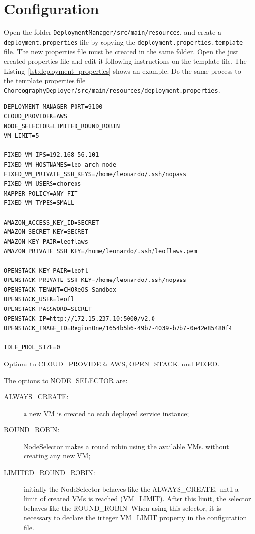 \documentclass[a4paper, 10pt]{article}
\begin{document}
\section{Configuration}

Open the folder \texttt{DeploymentManager/src/main/resources}, and create a \texttt{deployment.properties} file by copying the \texttt{deployment.properties.template} file. The new properties file must be created in the same folder. Open the just created properties file and edit it following instructions on the template file. The Listing~\ref{lst:deployment_properties} shows an example. Do the same process to the template properties file \texttt{ChoreographyDeployer/src/main/resources/deployment.properties}.

\lstset{
numbers=left
}

{\footnotesize
\begin{lstlisting}[caption=deployment.properties example,label=lst:deployment_properties] 
DEPLOYMENT_MANAGER_PORT=9100
CLOUD_PROVIDER=AWS
NODE_SELECTOR=LIMITED_ROUND_ROBIN
VM_LIMIT=5

FIXED_VM_IPS=192.168.56.101
FIXED_VM_HOSTNAMES=leo-arch-node
FIXED_VM_PRIVATE_SSH_KEYS=/home/leonardo/.ssh/nopass
FIXED_VM_USERS=choreos
MAPPER_POLICY=ANY_FIT
FIXED_VM_TYPES=SMALL

AMAZON_ACCESS_KEY_ID=SECRET
AMAZON_SECRET_KEY=SECRET
AMAZON_KEY_PAIR=leoflaws
AMAZON_PRIVATE_SSH_KEY=/home/leonardo/.ssh/leoflaws.pem

OPENSTACK_KEY_PAIR=leofl
OPENSTACK_PRIVATE_SSH_KEY=/home/leonardo/.ssh/nopass
OPENSTACK_TENANT=CHOReOS_Sandbox
OPENSTACK_USER=leofl
OPENSTACK_PASSWORD=SECRET
OPENSTACK_IP=http://172.15.237.10:5000/v2.0
OPENSTACK_IMAGE_ID=RegionOne/1654b5b6-49b7-4039-b7b7-0e42e85480f4

IDLE_POOL_SIZE=0

\end{lstlisting}
}

Options to CLOUD\_PROVIDER: AWS, OPEN\_STACK, and FIXED.

The options to NODE\_SELECTOR are: 

\begin{description}
\item [ALWAYS\_CREATE:] a new VM is created to each deployed service instance;
\item [ROUND\_ROBIN:] \textsf{NodeSelector} makes a round robin using the available VMs, without creating any new VM;
\item [LIMITED\_ROUND\_ROBIN:] initially the \textsf{NodeSelector} behaves like the ALWAYS\_CREATE, until a limit of created VMs is reached (VM\_LIMIT). After this limit, the selector behaves like the ROUND\_ROBIN. When using this selector, it is necessary to declare the integer VM\_LIMIT property in the configuration file.
\end{description}
\end{document}
